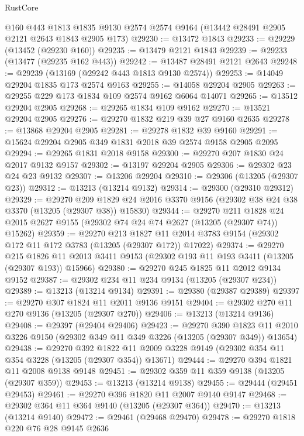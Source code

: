 \begin{lexlean}{RustCore}
\begin{coremodule}
    @160
    @443
    @1813
    @1835
    @9130
    @2574
    @2574
    @9164
    (@13442 @28491 @2905 @2121 @2643 @1843 @2905 @173)
@29230 := @13472 @1843
@29233 := @29229 (@13452 (@29230 @160))
@29235 := @13479 @2121 @1843
@29239 := @29233 (@13477 (@29235 @162 @443))
@29242 := @13487 @28491 @2121 @2643
@29248 := @29239 (@13169 (@29242 @443 @1813 @9130 @2574))
@29253 := @14049 @29204 @1835 @173 @2574 @9163
@29255 := @14058 @29204 @2905
@29263 := @29255 @229 @173 @1834 @109 @2574 @9162 @6064 @14071
@29265 := @13512 @29204 @2905
@29268 := @29265 @1834 @109 @9162
@29270 := @13521 @29204 @2905
@29276 := @29270 @1832 @219 @39 @27 @9160 @2635
@29278 := @13868 @29204 @2905
@29281 := @29278 @1832 @39 @9160
@29291 := @15624 @29204 @2905 @349 @1831 @2018 @39 @2574 @9158 @2905 @2095
@29294 := @29265 @1831 @2018 @9158
@29300 := @29270 @207 @1830 @24 @2017 @9132 @9157
@29302 := @13197 @29204 @2905
@29306 := @29302 @23 @24 @23 @9132
@29307 := @13206 @29204
@29310 := @29306 (@13205 (@29307 @23))
@29312 := @13213 (@13214 @9132)
@29314 := @29300 (@29310 @29312)
@29329 := @29270
    @209
    @1829
    @24
    @2016
    @3370
    @9156
    (@29302 @38 @24 @38 @3370 (@13205 (@29307 @38)) @15830)
@29344 := @29270
    @211
    @1828
    @24
    @2015
    @2627
    @9155
    (@29302 @74 @24 @74 @2627 (@13205 (@29307 @74)) @15262)
@29359 := @29270
    @213
    @1827
    @11
    @2014
    @3783
    @9154
    (@29302 @172 @11 @172 @3783 (@13205 (@29307 @172)) @17022)
@29374 := @29270
    @215
    @1826
    @11
    @2013
    @3411
    @9153
    (@29302 @193 @11 @193 @3411 (@13205 (@29307 @193)) @15966)
@29380 := @29270 @245 @1825 @11 @2012 @9134 @9152
@29387 := @29302 @234 @11 @234 @9134 (@13205 (@29307 @234))
@29389 := @13213 (@13214 @9134)
@29391 := @29380 (@29387 @29389)
@29397 := @29270 @307 @1824 @11 @2011 @9136 @9151
@29404 := @29302 @270 @11 @270 @9136 (@13205 (@29307 @270))
@29406 := @13213 (@13214 @9136)
@29408 := @29397 (@29404 @29406)
@29423 := @29270
    @390
    @1823
    @11
    @2010
    @3226
    @9150
    (@29302 @349 @11 @349 @3226 (@13205 (@29307 @349)) @13654)
@29438 := @29270
    @392
    @1822
    @11
    @2009
    @3228
    @9149
    (@29302 @354 @11 @354 @3228 (@13205 (@29307 @354)) @13671)
@29444 := @29270 @394 @1821 @11 @2008 @9138 @9148
@29451 := @29302 @359 @11 @359 @9138 (@13205 (@29307 @359))
@29453 := @13213 (@13214 @9138)
@29455 := @29444 (@29451 @29453)
@29461 := @29270 @396 @1820 @11 @2007 @9140 @9147
@29468 := @29302 @364 @11 @364 @9140 (@13205 (@29307 @364))
@29470 := @13213 (@13214 @9140)
@29472 := @29461 (@29468 @29470)
@29478 := @29270 @1818 @220 @76 @28 @9145 @2636

\end{coremodule}
\end{lexlean}
